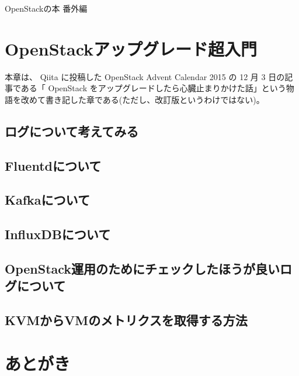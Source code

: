\documentclass[9pt,b5paper,tombo,openany]{jsbook}
\begin{document}
\noindent
{\Huge OpenStackの本 番外編}

\vspace*{-1in}
\begin{minipage}{0.4\paperwidth}
	\tableofcontents
\end{minipage}

\vspace*{1in}
\begin{minipage}{0.4\paperwidth}
	\begin{spacing}{0.75}
	\end{spacing}
\end{minipage}

\thispagestyle{empty}

\chapter{OpenStackアップグレード超入門}

\setcounter{page}{1}

本章は、 Qiita に投稿した OpenStack Advent Calendar 2015 の 12 月 3 日の記事である「 OpenStack をアップグレードしたら心臓止まりかけた話」という物語を改めて書き記した章である(ただし、改訂版というわけではない)。

\section{ログについて考えてみる}
\section{Fluentdについて}
\section{Kafkaについて}
\section{InfluxDBについて}
\section{OpenStack運用のためにチェックしたほうが良いログについて}
\section{KVMからVMのメトリクスを取得する方法}




\chapter{あとがき}
\end{document}
